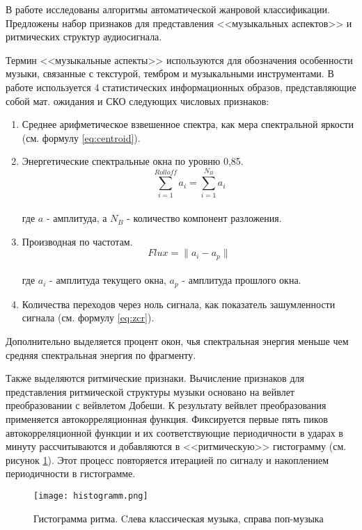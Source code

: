 В работе\cite{src1} исследованы алгоритмы автоматической жанровой классификации. Предложены набор признаков для представления <<музыкальных аспектов>> и ритмических структур аудиосигнала. 

Термин <<музыкальные аспекты>> используются для обозначения особенности музыки, связанные с текстурой, тембром и музыкальными инструментами. В работе используется 4 статистических информационных образов, представляющие собой мат. ожидания и СКО следующих числовых признаков:

\begin{enumerate}[label=\arabic*.]
\item Среднее арифметическое взвешенное спектра, как мера спектральной яркости (см. формулу \ref{eq:centroid}).
\item Энергетические спектральные окна по уровню 0,85.
\begin{equation}\label{eq:rolloff}
 \sum\limits_{i=1}^{Rolloff} a_i =  \sum\limits_{i=1}^{N_B} a_i
\end{equation}  \\
где $ a $ - амплитуда,  а $N_B$ - количество компонент разложения. 
\item Производная по частотам.
\begin{equation}\label{eq:flux}
Flux = \lVert a_i - a_p \rVert
\end{equation}  \\
где $a_i$ - амплитуда текущего окна, $a_p$ - амплитуда прошлого окна.
\item Количества переходов через ноль сигнала, как показатель зашумленности сигнала (см. формулу \ref{eq:zcr}).
\end{enumerate}

Дополнительно выделяется процент окон, чья спектральная энергия меньше чем средняя спектральная энергия по фрагменту.

Также выделяются ритмические признаки. Вычисление признаков для представления ритмической структуры музыки основано на вейвлет преобразовании с вейвлетом Добеши. К результату вейвлет преобразования применяется автокорреляционная функция. Фиксируется первые пять пиков автокорреляционной функции и их соответствующие периодичности в ударах в минуту рассчитываются и добавляются в <<ритмическую>> гистограмму (см. рисунок \ref{fig:domain:histogramm}). Этот процесс повторяется итерацией по сигналу и накоплением периодичности в гистограмме. 

\begin{figure}[ht]
\centering
  \texttt{[image: histogramm.png]}
  \caption{Гистограмма ритма. Cлева классическая музыка, справа поп-музыка}
  \label{fig:domain:histogramm}
\end{figure}

